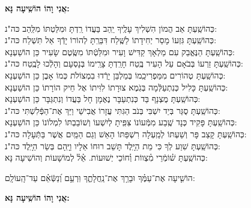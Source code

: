 \documentclass[twoside, openany, parskip=half, 11pt]{book}
\begin{document}
\begin{large}
\textbf{אֲנִי וָהוֹ הוֹשִֽׁיעָה נָּא:}
\end{large}

\begin{small}
כְּהוֹשַֽׁעְתָּ אַב הֲמוֹן הִשְׁלִיךְ עָלֶֽיךָ יַֽהַב בַּעֲדוֹ רַֽדְתָּ וּמִלַּטְתּוֹ מִלַּֽהַב 	\hfill	כּה"נ:\\
כְּהוֹשַֽׁעְתָּ גִּזְעוֹ מָסַר יְחִידָתוֹ לַשֶּֽׁלַח דִּבַּרְֽתָּ לְהוֹרוֹ יָדְֿךָ אַל תִּשְׁלַח 	\hfill	כּה"נ: \\
כְּהוֹשַֽׁעְתָּ הַנֶּאֱבַק עִם מַלְאָךְ קַדִּישׁ וָעִיר וּמִלַּטְֿתּוֹ מִשֶּֽׂטֶם שָׂעִיר 	\hfill	כֵּן הוֹשַׁעְנָא: \\
כְּהוֹשַֽׁעְתָּ זַרְעוֹ בְּבֹאָם עַל הָעִיר בֶּֽטַח חָרַֽדְתָּ צָרֵֽימוֹ בְּנָסְעָם וְהָלְֿכוּ לָבֶֽטַח \hfill	כּה"נ: \\
כְּהוֹשַֽׁעְתָּ טְהוֹרִים מִמַּפְרִיכֵֽמוֹ בְּמַלְבֵּן יָרְֿדוּ בִמְצוֹלֹת כְּמוֹ אָבֶן 			\hfill כֵּן הוֹשַׁעְנָא: \\
כְּהוֹשַֽׁעְתָּ כָּלִיל כְּנִתְעַלְּֿמָה בְּגֹֽמֶא צוּרָתוֹ לִוִּיתוֹ אֶל חֵיק הוֹרָתוֹ 	\hfill	כֵּן הוֹשַׁעְנָא: \\
כְּהוֹשַֽׁעְתָּ מֻצְנָף בַּד כְּנִתְעַבָּר נֶאֶמָן חָל בַּעֲדוֹ וְנִתְגַּבָּר 			\hfill	כֵּן הוֹשַׁעְנָא: \\
כְּהוֹשַֽׁעְתָּ סֻגַּר בְּיַד יִשְׁבִּי בְּנֹב הַגִּתִּי עֲזָרוֹ אֲבִישַׁי וַיַּךְ אֶת־הַפְּֿלִשְׁתִּי 	\hfill	כּה"נ:\\
כְּהוֹשַֽׁעְתָּ פָּקִיד כְּנָד שֶֽׁבַע מִמְּֿעוֹנוֹ צִּפִּֽיתָ לְיִשְׁעוֹ וְשׁוֹבַבְתּוֹ לִמְלוֹנוֹ 	\hfill	כֵּן הוֹשַׁעְנָא:\\
כְּהוֹשַֽׁעְתָּ קָצַב פָּר וְשַׁעְתּוֹ לְמַֽעְלָה רִשְׁפַּתּוֹ הָאֵשׁ וְגַם הַמַּֽיִם אֲשֶׁר בַּתְּֿעָלָה \hfill	כּה"נ:\\
כְּהוֹשַֽׁעְתָּ שִׁוַע לְךָ כִּי מֵת הַיָּֽלֶד תָּשֵׁב רוּחוֹ אֵלָיו וַיָּֽהָם בְּשַׂר הַיָּֽלֶד 	\hfill	כּה"נ:\\
 כְּהוֹשַֽׁעְתָּ שׁ֗וֹמְֿרֵי מִ֗צְווֹת וְ֗חוֹכֵי יְשׁוּעוֹת. אֵ֗ל֗ לְמוֹשָׁעוֹת 		\hfill	וְהוֹשִׁיעָה נָּא:\\

\end{small}

הוֹשִׁ֤יעָה  אֶת־עַמֶּ֗ךָ וּבָרֵ֥ךְ אֶת־נַֽחֲלָתֶ֑ךָ וּֽרְעֵ֥ם וְ֝נַשְּֿׂאֵ֗ם עַד־הָֽעוֹלָֽם:


\begin{large}
\textbf{אֲנִי וָהוֹ הוֹשִֽׁיעָה נָּא:}
\end{large}
\end{document}
